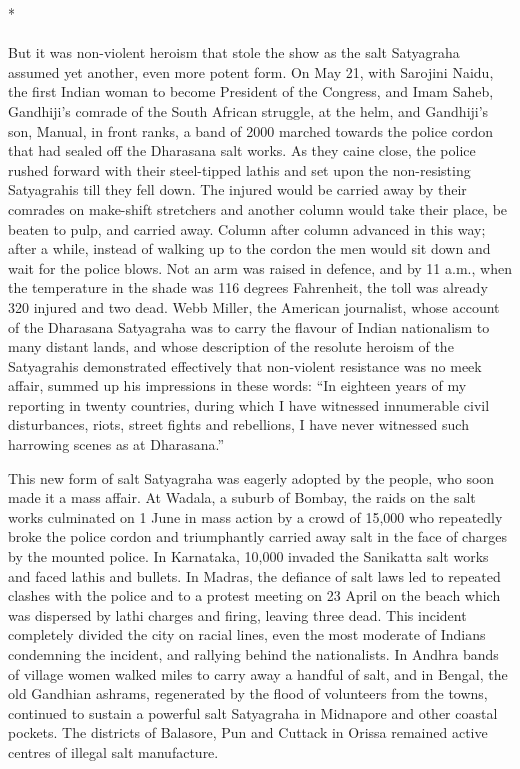 \begin{multicols}{2}
\begin{center}*\end{center}

\paragraph*{}

But it was non-violent heroism that stole the show as the salt Satyagraha assumed yet another, even more potent form. On May 21, with Sarojini Naidu, the first Indian woman to become President of the Congress, and Imam Saheb, Gandhiji's comrade of the South African struggle, at the helm, and Gandhiji's son, Manual, in front ranks, a band of 2000 marched towards the police cordon that had sealed off the Dharasana salt works. As they caine close, the police rushed forward with their steel-tipped lathis and set upon the non-resisting Satyagrahis till they fell down. The injured would be carried away by their comrades on make-shift stretchers and another column would take their place, be beaten to pulp, and carried away. Column after column advanced in this way; after a while, instead of walking up to the cordon the men would sit down and wait for the police blows. Not an arm was raised in defence, and by 11 a.m., when the temperature in the shade was 116 degrees Fahrenheit, the toll was already 320 injured and two dead. Webb Miller, the American journalist, whose account of the Dharasana Satyagraha was to carry the flavour of Indian nationalism to many distant lands, and whose description of the resolute heroism of the Satyagrahis demonstrated effectively that non-violent resistance was no meek affair, summed up his impressions in these words: ``In eighteen years of my reporting in twenty countries, during which I have witnessed innumerable civil disturbances, riots, street fights and rebellions, I have never witnessed such harrowing scenes as at Dharasana.''

This new form of salt Satyagraha was eagerly adopted by the people, who soon made it a mass affair. At Wadala, a suburb of Bombay, the raids on the salt works culminated on 1 June in mass action by a crowd of 15,000 who repeatedly broke the police cordon and triumphantly carried away salt in the face of charges by the mounted police. In Karnataka, 10,000 invaded the Sanikatta salt works and faced lathis and bullets. In Madras, the defiance of salt laws led to repeated clashes with the police and to a protest meeting on 23 April on the beach which was dispersed by lathi charges and firing, leaving three dead. This incident completely divided the city on racial lines, even the most moderate of Indians condemning the incident, and rallying behind the nationalists. In Andhra bands of village women walked miles to carry away a handful of salt, and in Bengal, the old Gandhian ashrams, regenerated by the flood of volunteers from the towns, continued to sustain a powerful salt Satyagraha in Midnapore and other coastal pockets. The districts of Balasore, Pun and Cuttack in Orissa remained active centres of illegal salt manufacture.


\end{multicols}
